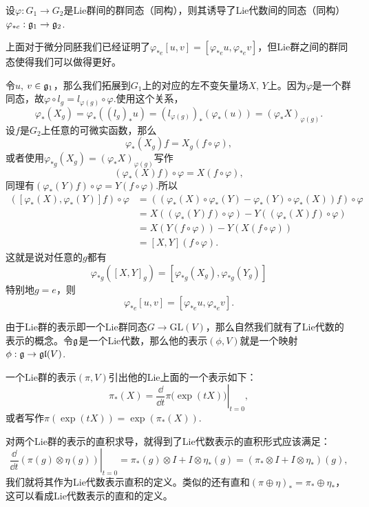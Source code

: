 

\para 设$\varphi:G_1\to G_2$是Lie群间的群同态（同构），则其诱导了Lie代数间的同态（同构）$\varphi_{*e}:{\mathfrak{g}}_1\to {\mathfrak{g}}_2$.

上面对于微分同胚我们已经证明了$\varphi_{*e}[u,v]=[\varphi_{*e}u,\varphi_{*e}v]$，但Lie群之间的群同态使得我们可以做得更好。

令$u$, $v\in{\mathfrak{g}}_1$，那么我们拓展到$G_1$上的对应的左不变矢量场$X$, $Y$上。因为$\varphi$是一个群同态，故$\varphi\circ l_g=l_{\varphi(g)}\circ \varphi$.使用这个关系，
\[
	\varphi_{*}(X_g)=\varphi_{*}((l_g)_*u)=(l_{\varphi(g)})_*(\varphi_{*}(u))=(\varphi_{*}X)_{\varphi(g)}.
\]
设$f$是$G_2$上任意的可微实函数，那么
\[
\varphi_{*}(X_g)f=X_g(f\circ \varphi),
\]
或者使用$\varphi_{*g}(X_g)=(\varphi_{*}X)_{\varphi(g)}$写作
\[
(\varphi_{*}(X)f)\circ \varphi=X(f\circ \varphi),
\]
同理有$(\varphi_{*}(Y)f)\circ \varphi=Y(f\circ \varphi)$.所以
\[
	\begin{split}
		([\varphi_*(X),\varphi_*(Y)]f)\circ \varphi&=((\varphi_*(X)\circ\varphi_*(Y)-\varphi_*(Y)\circ\varphi_*(X))f)\circ \varphi\\
		&=X((\varphi_*(Y)f)\circ \varphi)-Y((\varphi_*(X)f)\circ \varphi)\\
		&=X(Y(f\circ \varphi))-Y(X(f\circ \varphi))\\
		&=[X,Y](f\circ \varphi).
	\end{split}
\]
这就是说对任意的$g$都有
\[
	\varphi_{*g}([X,Y]_g)=[\varphi_{*g}(X_g),\varphi_{*g}(Y_g)]
\]
特别地$g=e$，则
\[
	\varphi_{*e}[u,v]=[\varphi_{*e}u,\varphi_{*e}v].
\]

\para 由于Lie群的表示即一个Lie群同态$G\to \mathrm{GL}(V)$，那么自然我们就有了Lie代数的表示的概念。令${\mathfrak{g}}$是一个Lie代数，那么他的表示$(\phi,V)$就是一个映射$\phi:{\mathfrak{g}}\to\mathfrak{gl}(V)$.

一个Lie群的表示$(\pi,V)$引出他的Lie上面的一个表示如下：
\[
	\pi_*(X)=\left.\frac{\dd}{\dd t}\pi\bigl(\exp(tX)\bigr)\right|_{t=0},
\]
或者写作$\pi(\exp(tX))=\exp(\pi_*(X))$.

对两个Lie群的表示的直积求导，就得到了Lie代数表示的直积形式应该满足：
\[
	\left.\frac{\dd}{\dd t}(\pi(g)\otimes \eta(g))\right|_{t=0}=\pi_*(g)\otimes I+I\otimes \eta_*(g)=(\pi_*\otimes I+I\otimes \eta_*)(g),
\]
我们就将其作为Lie代数表示直积的定义。类似的还有直和$(\pi\oplus \eta)_*=\pi_*\oplus \eta_*$，这可以看成Lie代数表示的直和的定义。

